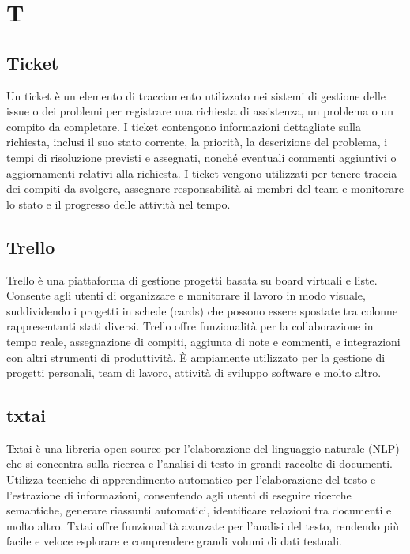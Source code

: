 \section{T}


\vspace{2em}
\subsection*{Ticket}
Un ticket è un elemento di tracciamento utilizzato nei sistemi di gestione delle issue o dei problemi per registrare una richiesta di assistenza, un problema o un compito da completare. I ticket contengono informazioni dettagliate sulla richiesta, inclusi il suo stato corrente, la priorità, la descrizione del problema, i tempi di risoluzione previsti e assegnati, nonché eventuali commenti aggiuntivi o aggiornamenti relativi alla richiesta. I ticket vengono utilizzati per tenere traccia dei compiti da svolgere, assegnare responsabilità ai membri del team e monitorare lo stato e il progresso delle attività nel tempo.

\vspace{2em}
\subsection*{Trello}
Trello è una piattaforma di gestione progetti basata su board virtuali e liste. Consente agli utenti di organizzare e monitorare il lavoro in modo visuale, suddividendo i progetti in schede (cards) che possono essere spostate tra colonne rappresentanti stati diversi. Trello offre funzionalità per la collaborazione in tempo reale, assegnazione di compiti, aggiunta di note e commenti, e integrazioni con altri strumenti di produttività. È ampiamente utilizzato per la gestione di progetti personali, team di lavoro, attività di sviluppo software e molto altro.

\vspace{2em}
\subsection*{txtai}
Txtai è una libreria open-source per l'elaborazione del linguaggio naturale (NLP) che si concentra sulla ricerca e l'analisi di testo in grandi raccolte di documenti. Utilizza tecniche di apprendimento automatico per l'elaborazione del testo e l'estrazione di informazioni, consentendo agli utenti di eseguire ricerche semantiche, generare riassunti automatici, identificare relazioni tra documenti e molto altro. Txtai offre funzionalità avanzate per l'analisi del testo, rendendo più facile e veloce esplorare e comprendere grandi volumi di dati testuali.
